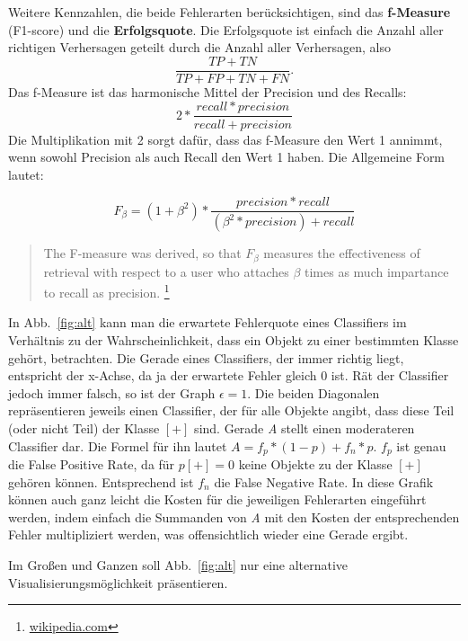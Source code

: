 Weitere Kennzahlen, die beide Fehlerarten berücksichtigen, sind das 
\textbf{f-Measure} (F1-score) und die \textbf{Erfolgsquote}. Die 
Erfolgsquote ist einfach die Anzahl aller richtigen Verhersagen geteilt durch die
Anzahl aller Verhersagen, also
\[
	\frac{TP+TN}{TP+FP+TN+FN}.
\]
Das f-Measure ist das harmonische Mittel der Precision und des Recalls:
\[
	2 * \frac{recall * precision}{recall + precision}
\]
Die Multiplikation mit 2 sorgt dafür, dass das f-Measure den Wert 1 annimmt,
wenn sowohl Precision als auch Recall den Wert 1 haben. Die Allgemeine Form
lautet:

\[
	F_\beta = (1 + \beta ^2) * \frac{precision * recall}{(\beta^2 * precision) + recall}
\]

\begin{quote}
	\glqq The F-measure was derived, so that \(F_\beta\) 
	measures the effectiveness of retrieval
	with respect to a user who attaches \(\beta\) times as much impartance to recall as 
	precision. \grqq
	\footnote{\href{https://en.wikipedia.org/wiki/F1_score}{wikipedia.com}}
\end{quote}



In Abb.~\ref{fig:alt} kann man die erwartete Fehlerquote eines Classifiers im
Verhältnis zu der Wahrscheinlichkeit, dass ein Objekt zu einer bestimmten Klasse
gehört, betrachten. Die Gerade eines Classifiers, der immer richtig liegt, entspricht
der x-Achse, da ja der erwartete Fehler gleich 0 ist. Rät der Classifier jedoch immer
falsch, so ist der Graph \(\epsilon = 1\). Die beiden Diagonalen repräsentieren 
jeweils einen Classifier, der für alle Objekte angibt, dass diese Teil (oder nicht Teil)
der Klasse \([+]\) sind. Gerade \textit{A} stellt einen moderateren Classifier dar. 
Die Formel für ihn lautet \(A = f_p * (1-p) + f_n * p\). \(f_p\) ist genau die 
False Positive Rate, da für \(p[+]=0\) keine Objekte zu der Klasse \([+]\) gehören
können. Entsprechend ist \(f_n\) die False Negative Rate. In diese Grafik können
auch ganz leicht die Kosten für die jeweiligen Fehlerarten eingeführt werden,
indem einfach die Summanden von \textit{A} mit den Kosten der entsprechenden Fehler
multipliziert werden, was offensichtlich wieder eine Gerade ergibt.

Im Großen und Ganzen soll Abb.~\ref{fig:alt} nur eine alternative 
Visualisierungsmöglichkeit präsentieren.


